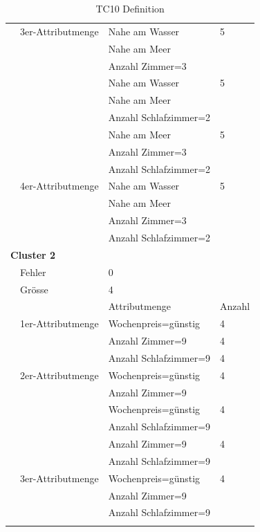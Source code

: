 \begin{longtable}{ | l | l | l | l |}
	& 3er-Attributmenge & \tabitem Nahe am Wasser & 5 \\
	& & \tabitem Nahe am Meer & \\ 
	& & \tabitem Anzahl Zimmer=3 & \\ \cline{3-4} 
	& & \tabitem Nahe am Wasser & 5 \\
	& & \tabitem Nahe am Meer & \\ 
	& & \tabitem Anzahl Schlafzimmer=2 & \\ \cline{3-4}
	& & \tabitem Nahe am Meer & 5 \\
	& & \tabitem Anzahl Zimmer=3 & \\ 
	& & \tabitem Anzahl Schlafzimmer=2 & \\ \cline{2-4}

	& 4er-Attributmenge & \tabitem Nahe am Wasser & 5 \\
	& & \tabitem Nahe am Meer & \\ 
	& & \tabitem Anzahl Zimmer=3 & \\ 
	& & \tabitem Anzahl Schlafzimmer=2 & \\ \hline

	\multicolumn{4}{|l|}{\textbf{Cluster 2}} \\ \cline{2-4} 
	& Fehler & \multicolumn{2}{|l|}{0} \\ \cline{2-4} 
	& Grösse & \multicolumn{2}{|l|}{4} \\ \cline{2-4} 
	& & Attributmenge & Anzahl \\ \cline{2-4} 
	
	& 1er-Attributmenge & \tabitem Wochenpreis=günstig & 4 \\ \cline{3-4}
	& & \tabitem Anzahl Zimmer=9 & 4 \\ \cline{3-4}
	& & \tabitem Anzahl Schlafzimmer=9 & 4 \\ \cline{2-4} 
	
	& 2er-Attributmenge & \tabitem Wochenpreis=günstig & 4 \\
	& & \tabitem Anzahl Zimmer=9 & \\ \cline{3-4}
	& & \tabitem Wochenpreis=günstig & 4 \\
	& & \tabitem Anzahl Schlafzimmer=9 & \\ \cline{3-4} 
	& & \tabitem Anzahl Zimmer=9 & 4 \\
	& & \tabitem Anzahl Schlafzimmer=9 & \\ \cline{2-4}

	& 3er-Attributmenge & \tabitem Wochenpreis=günstig & 4 \\
	& & \tabitem Anzahl Zimmer=9 & \\ 
	& & \tabitem Anzahl Schlafzimmer=9 & \\ \hline
	
	\caption{TC10 Definition}
	\centering
	\label{fig:recherche:testcases:10}
\end{longtable}


